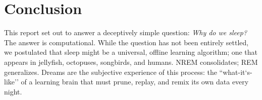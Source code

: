 \chapter*{Conclusion}\label{ch:conclusion}

This report set out to answer a deceptively simple question: \emph{Why do we sleep?} The answer is computational. While the question has not been entirely settled, we postulated that sleep might be a universal, offline learning algorithm; one that appears in jellyfish, octopuses, songbirds, and humans. NREM consolidates; REM generalizes. Dreams are the subjective experience of this process: the ``what-it`s-like'' of a learning brain that must prune, replay, and remix its own data every night.